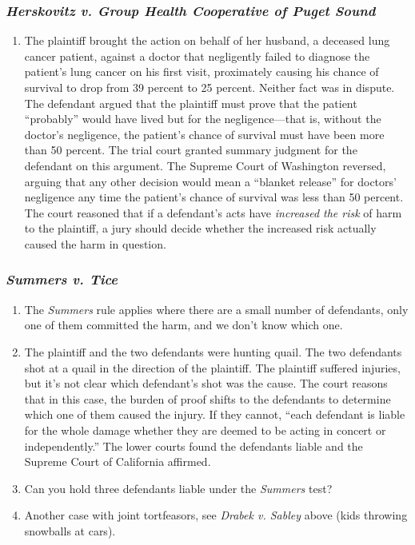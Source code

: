 \subsubsection{\emph{Herskovitz v. Group Health Cooperative of Puget Sound}}

\begin{enumerate}
    \item The plaintiff brought the action on behalf of her husband, a 
    deceased lung cancer patient, against a doctor that negligently failed to 
    diagnose the patient's lung cancer on his first visit, proximately causing 
    his chance of survival to drop from 39 percent to 25 percent. Neither fact 
    was in dispute. The defendant argued that the plaintiff must prove that 
    the patient ``probably'' would have lived but for the negligence---that 
    is, without the doctor's negligence, the patient's chance of survival must 
    have been more than 50 percent. The trial court granted summary judgment 
    for the defendant on this argument. The Supreme Court of Washington 
    reversed, arguing that any other decision would mean a ``blanket release'' 
    for doctors' negligence any time the patient's chance of survival was less 
    than 50 percent. The court reasoned that if a defendant's acts have 
    \emph{increased the risk} of harm to the plaintiff, a jury should decide 
    whether the increased risk actually caused the harm in question.
\end{enumerate}

\subsubsection{\emph{Summers v. Tice}}

\begin{enumerate}
    \item The \emph{Summers} rule applies where there are a small number of 
    defendants, only one of them committed the harm, and we don't know which 
    one.
    \item The plaintiff and the two defendants were hunting quail. The two 
    defendants shot at a quail in the direction of the plaintiff. The 
    plaintiff suffered injuries, but it's not clear which defendant's shot was 
    the cause. The court reasons that in this case, the burden of proof shifts 
    to the defendants to determine which one of them caused the injury. If 
    they cannot, ``each defendant is liable for the whole damage whether they 
    are deemed to be acting in concert or independently.'' The lower courts 
    found the defendants liable and the Supreme Court of California affirmed.
    \item Can you hold three defendants liable under the \emph{Summers} test?
    \item Another case with joint tortfeasors, see \emph{Drabek v. Sabley} 
    above (kids throwing snowballs at cars).
\end{enumerate}

